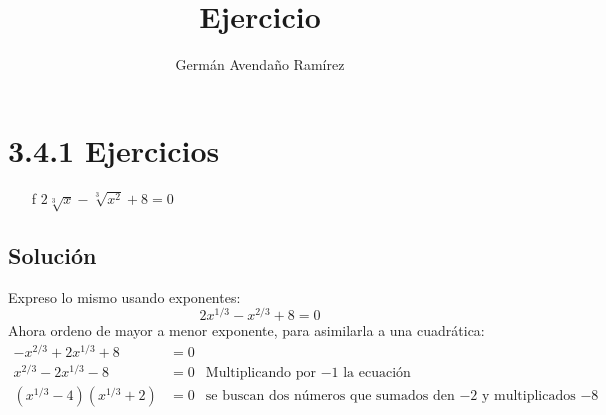 \documentclass[10pt,a4paper]{article}
\author{Germán Avendaño Ramírez}
\title{Ejercicio}
\begin{document}
\section*{3.4.1 Ejercicios}
\begin{enumerate}
\item[f] $2\sqrt[3]{x}-\sqrt[3]{x^2}+8=0$
\end{enumerate}
\subsection*{Soluci\'on}
Expreso lo mismo usando exponentes:
\[2x^{1/3}-x^{2/3}+8=0\]
Ahora ordeno de mayor a menor exponente, para asimilarla a una cuadrática:
\begin{align*}
-x^{2/3}+2x^{1/3}+8&=0 &\\
x^{2/3}-2x^{1/3}-8&=0 & \mbox{Multiplicando por $-1$ la ecuación}\\
(x^{1/3}-4)(x^{1/3}+2)&=0 & \mbox{se buscan dos números que sumados den $-2$ y multiplicados $-8$} 
\end{align*}
\end{document}
